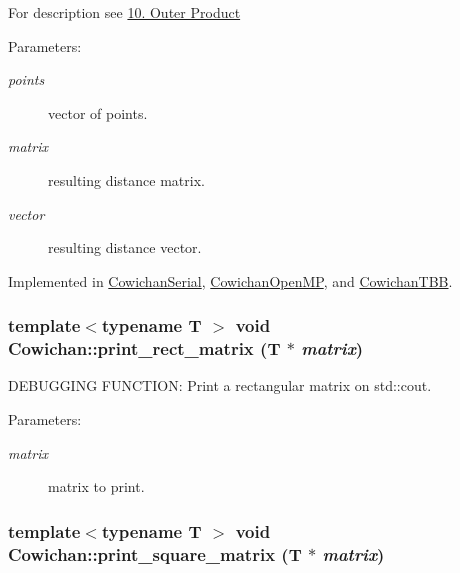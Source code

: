 For description see \hyperlink{index_outer_sec}{10. Outer Product} \begin{Desc}
\item[Parameters:]
\begin{description}
\item[{\em points}]vector of points. \item[{\em matrix}]resulting distance matrix. \item[{\em vector}]resulting distance vector. \end{description}
\end{Desc}


Implemented in \hyperlink{class_cowichan_serial_05f6899081a457d58978e4f6bda2db6a}{CowichanSerial}, \hyperlink{class_cowichan_open_m_p_99a0570f754ac82968d73093476de533}{CowichanOpenMP}, and \hyperlink{class_cowichan_t_b_b_92a763b9733cdcceda13b7b7ea0bc229}{CowichanTBB}.\hypertarget{class_cowichan_14e706ef5a5f7661a623c595d7ed76f1}{
\subsubsection[{print\_\-rect\_\-matrix}]{\setlength{\rightskip}{0pt plus 5cm}template$<$typename T $>$ void Cowichan::print\_\-rect\_\-matrix (T $\ast$ {\em matrix})}}
\label{class_cowichan_14e706ef5a5f7661a623c595d7ed76f1}


DEBUGGING FUNCTION: Print a rectangular matrix on std::cout. \begin{Desc}
\item[Parameters:]
\begin{description}
\item[{\em matrix}]matrix to print. \end{description}
\end{Desc}
\hypertarget{class_cowichan_e8fdfb7dd3e8be0a7e9dbc531b1298d2}{
\subsubsection[{print\_\-square\_\-matrix}]{\setlength{\rightskip}{0pt plus 5cm}template$<$typename T $>$ void Cowichan::print\_\-square\_\-matrix (T $\ast$ {\em matrix})}}
\label{class_cowichan_e8fdfb7dd3e8be0a7e9dbc531b1298d2}


